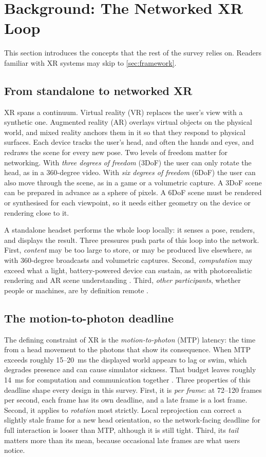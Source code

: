 \section{Background: The Networked XR Loop}\label{sec:background}

This section introduces the concepts that the rest of the survey relies on. Readers familiar with XR
systems may skip to \cref{sec:framework}.

\subsection{From standalone to networked XR}
XR spans a continuum. Virtual reality (VR) replaces the user's view with a synthetic one. Augmented
reality (AR) overlays virtual objects on the physical world, and mixed reality anchors them in it so
that they respond to physical surfaces. Each device tracks the user's head, and often the hands and eyes,
and redraws the scene for every new pose. Two levels of freedom matter for networking. With \emph{three
degrees of freedom} (3DoF) the user can only rotate the head, as in a 360-degree video. With \emph{six
degrees of freedom} (6DoF) the user can also move through the scene, as in a game or a volumetric
capture. A 3DoF scene can be prepared in advance as a sphere of pixels. A 6DoF scene must be rendered or
synthesised for each viewpoint, so it needs either geometry on the device or rendering close to it.

A standalone headset performs the whole loop locally: it senses a pose, renders, and displays the result.
Three pressures push parts of this loop into the network. First, \emph{content} may be too large to
store, or may be produced live elsewhere, as with 360-degree broadcasts and volumetric captures. Second,
\emph{computation} may exceed what a light, battery-powered device can sustain, as with photorealistic
rendering and AR scene understanding \cite{W3133913697}. Third, \emph{other participants}, whether
people or machines, are by definition remote \cite{W2561715836}.

\subsection{The motion-to-photon deadline}
The defining constraint of XR is the \emph{motion-to-photon} (MTP) latency: the time from a head movement
to the photons that show its consequence. When MTP exceeds roughly 15--20~ms the displayed world appears
to lag or swim, which degrades presence and can cause simulator sickness. That budget leaves roughly
14~ms for computation and communication together \cite{W2784711283}. Three properties of this deadline
shape every design in this survey. First, it is \emph{per frame}: at 72--120 frames per second, each
frame has its own deadline, and a late frame is a lost frame. Second, it applies to \emph{rotation} most
strictly. Local reprojection can correct a slightly stale frame for a new head orientation, so the
network-facing deadline for full interaction is looser than MTP, although it is still tight. Third, its
\emph{tail} matters more than its mean, because occasional late frames are what users notice.

